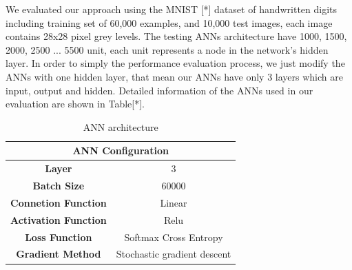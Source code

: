 We evaluated our approach using the MNIST [*] dataset of handwritten digits including training set of 60,000 examples,  and 10,000 test images, each image contains 28x28 pixel grey levels. The testing ANNs architecture have 1000, 1500, 2000, 2500 ... 5500 unit, each unit represents a node in the network's hidden layer. In order to simply the performance evaluation process, we just modify the ANNs with one hidden layer, that mean our ANNs have only 3 layers which are input, output and hidden. Detailed information of the ANNs used in our evaluation are shown in Table[*].
%
\begin{table}[]
\centering
\caption{ANN architecture}
\begin{tabular}{|c|c|}
\hline
\multicolumn{2}{|c|}{\textbf{ANN Configuration}}\\ \hline
\textbf{Layer} 	& 3 \\
\textbf{Batch Size} & 60000 \\
\textbf{Connetion Function} & Linear  \\
\textbf{Activation Function} & Relu  \\
\textbf{Loss Function} & Softmax Cross Entropy \\
\textbf{Gradient Method} &  Stochastic gradient descent \\
\hline
\end{tabular} 
\end{table}
